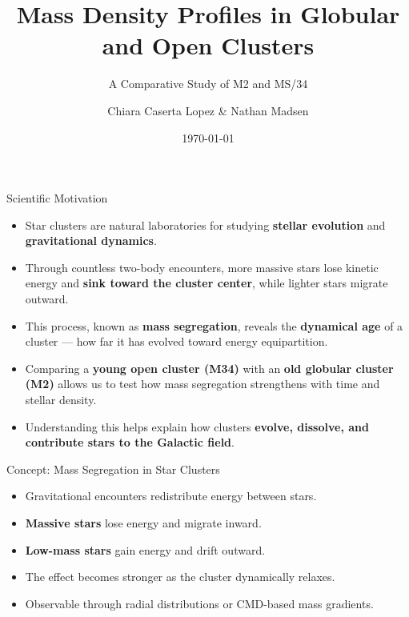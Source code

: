 \documentclass{beamer}
\title[Mass Density Profiles]{Mass Density Profiles in Globular and Open Clusters}
\subtitle{A Comparative Study of M2 and MS/34}
\author{Chiara Caserta Lopez \& Nathan Madsen}
\institute
{
    Department of Physics, Physics 134 \\
    UC Santa Barbara
}
\date{\today}
\begin{document}
\begin{frame}
    \titlepage
\end{frame}

\begin{frame}{Scientific Motivation}
\small
\begin{itemize}
    \item Star clusters are natural laboratories for studying \textbf{stellar evolution} and \textbf{gravitational dynamics}. \cite{binney2008}
    \vspace{0.2cm}
    \item Through countless two-body encounters, more massive stars lose kinetic energy and \textbf{sink toward the cluster center}, while lighter stars migrate outward.
    \vspace{0.2cm}
    \item This process, known as \textbf{mass segregation}, reveals the \textbf{dynamical age} of a cluster — how far it has evolved toward energy equipartition.
    \vspace{0.2cm}
    \item Comparing a \textbf{young open cluster (M34)} with an \textbf{old globular cluster (M2)} allows us to test how mass segregation strengthens with time and stellar density. \cite{2010ApJS..191..352H,2010ApJ...710.1787S}
    \vspace{0.2cm}
    \item Understanding this helps explain how clusters \textbf{evolve, dissolve, and contribute stars to the Galactic field}.
\end{itemize}
\end{frame}

\begin{frame}{Concept: Mass Segregation in Star Clusters}
    \begin{itemize}
        \item Gravitational encounters redistribute energy between stars.
        \item \textbf{Massive stars} lose energy and migrate inward.
        \item \textbf{Low-mass stars} gain energy and drift outward.
        \item The effect becomes stronger as the cluster dynamically relaxes.
        \item Observable through radial distributions or CMD-based mass gradients.
    \end{itemize}
\end{frame}
\end{document}
